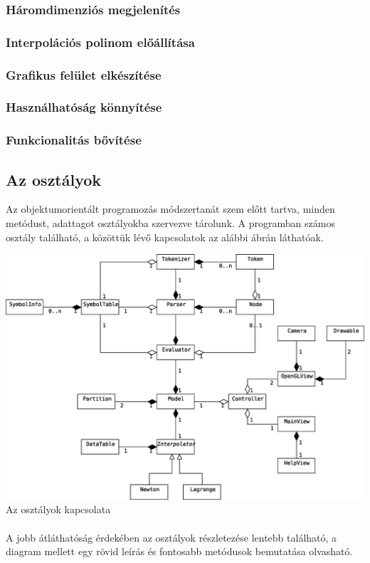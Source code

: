\documentclass[12pt]{report}
\begin{document}
\subsubsection{Háromdimenziós megjelenítés}
\subsubsection{Interpolációs polinom előállítása}
\subsubsection{Grafikus felület elkészítése}
\subsubsection{Használhatóság könnyítése}
\subsubsection{Funkcionalitás bővítése}

\subsection{Az osztályok}
Az objektumorientált programozás módszertanát szem előtt tartva, minden metódust, adattagot osztályokba szervezve tárolunk. A programban számos osztály található, a közöttük lévő kapcsolatok az alábbi ábrán láthatóak.
\begin{center}
\includegraphics[width=14cm]{pics/uml/classes}\\
{\footnotesize Az osztályok kapcsolata}
\end{center}
\paragraph{}
A jobb átláthatóság érdekében az osztályok részletezése lentebb található, a diagram mellett egy rövid leírás és fontosabb metódusok bemutatása olvasható.
\end{document}
